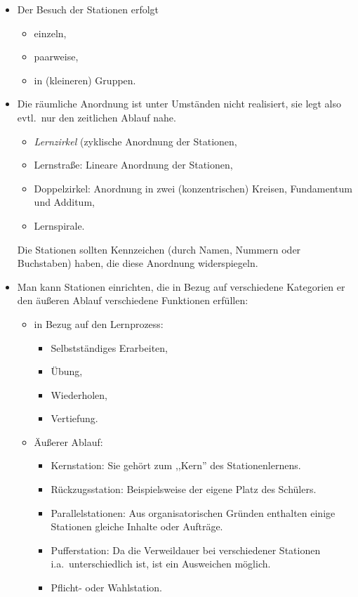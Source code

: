 \begin{itemize}
\item Der Besuch der Stationen erfolgt
\begin{itemize}
\item einzeln,
\item paarweise,
\item in (kleineren) Gruppen.
\end{itemize}

\item Die r\"{a}umliche Anordnung ist unter Umst\"{a}nden nicht realisiert, sie legt also evtl.\ nur den
zeitlichen Ablauf nahe.
\begin{itemize}
\item \emph{Lernzirkel} (zyklische Anordnung der Stationen,
\item Lernstra{\ss}e: Lineare Anordnung der Stationen,
\item Doppelzirkel: Anordnung in zwei (konzentrischen) Kreisen, Fundamentum und Additum,
\item Lernspirale.
\end{itemize}

Die Stationen sollten Kennzeichen (durch Namen, Nummern oder Buchstaben) haben, die diese Anordnung widerspiegeln.

\item Man kann Stationen einrichten, die in Bezug auf verschiedene Kategorien er den \"{a}u{\ss}eren Ablauf verschiedene
Funktionen erf\"{u}llen:
\begin{itemize}
\item in Bezug auf den Lernprozess:
\begin{itemize}
\item Selbstst\"{a}ndiges Erarbeiten,
\item \"{U}bung,
\item Wiederholen,
\item Vertiefung.
\end{itemize}

\item \"{A}u{\ss}erer Ablauf:
\begin{itemize}
\item Kernstation: Sie geh\"{o}rt zum ,,Kern'' des Stationenlernens.
\item R\"{u}ckzugsstation: Beispielsweise der eigene Platz des Sch\"{u}lers.
\item Parallelstationen: Aus organisatorischen Gr\"{u}nden enthalten einige Stationen gleiche Inhalte oder Auftr\"{a}ge.
\item Pufferstation: Da die Verweildauer bei verschiedener Stationen i.a.\ unterschiedlich ist, ist
ein Ausweichen m\"{o}glich.
\item Pflicht- oder Wahlstation.
\end{itemize}


\end{itemize}
\end{itemize}

